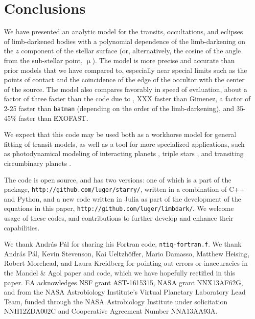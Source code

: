 \documentclass[modern]{aastex61}
\begin{document}
\section{Conclusions}

We have presented an analytic model for the transits, occultations, and
eclipses of limb-darkened bodies with a polynomial dependence of the limb-darkening
on the $z$ component of the stellar surface (or, alternatively, the
cosine of the angle from the sub-stellar point, $\upmu$).  The model is more precise
and accurate than prior models that we have compared to, especially near
special limits such as the points of contact and the coincidence of the edge
of the occultor with the center of the source.  The model also compares favorably in
speed of evaluation, about a factor of three faster than the code due
to \citet{Pal2008}, XXX faster than Gimenez, a factor of 2-25 faster than \texttt{batman}
(depending on the order of the limb-darkening), and 35-45\% faster than EXOFAST.

We expect that this code may be used both as a workhorse model for
general fitting of transit models, as well as a tool for more
specialized applications, such as photodynamical modeling of
interacting planets \citep{Carter2012}, triple stars \citep{Carter2011}, and 
transiting circumbinary planets \citep{Doyle2011}.

The code is open source, and has two versions:  one of which is a part
of the \starry package, \texttt{http://github.com/luger/starry/}, written
in a combination of C++ and Python, and a new code written in Julia as
part of the development of the equations in this paper,
\texttt{http://github.com/luger/limbdark/}.  We welcome usage of these
codes, and contributions to further develop and enhance their capabilities.

\acknowledgements

We thank Andr\'as P\'al for sharing his Fortran code, \texttt{ntiq-fortran.f}.
We thank Andr\'as P\'al, Kevin Stevenson, Kai Ueltzh\"offer, Mario Damasso,
Matthew Heising, Robert Morehead, and Laura Kreidberg for pointing out
errors or inaccuracies in the Mandel \& Agol paper and code, which we have
hopefully rectified in this paper.
EA acknowledges NSF grant AST-1615315, NASA grant NNX13AF62G, and from
the NASA Astrobiology Institute's Virtual Planetary Laboratory Lead Team,
funded through the NASA Astrobiology Institute under solicitation NNH12ZDA002C
and Cooperative Agreement Number NNA13AA93A.


\end{document}
